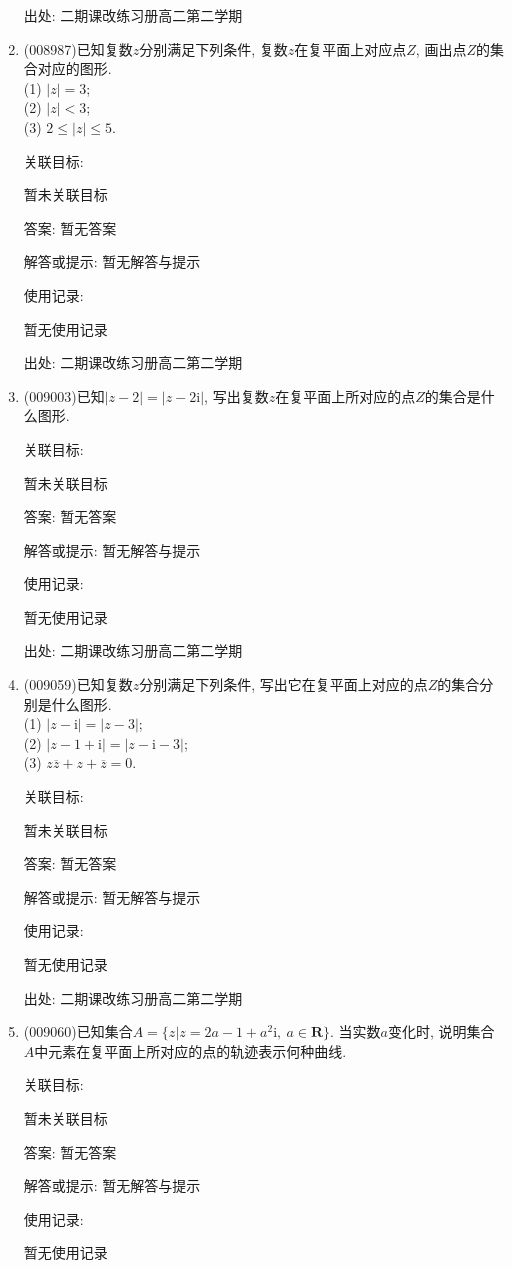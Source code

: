 \documentclass[10pt,a4paper]{article}
\begin{document}
\begin{enumerate}[1.]
出处: 二期课改练习册高二第二学期
\item { (008987)}已知复数$z$分别满足下列条件, 复数$z$在复平面上对应点$Z$, 画出点$Z$的集合对应的图形.\\
(1) $|z|=3$;\\ 
(2) $|z|<3$;\\
(3) $2\le|z|\le 5$.


关联目标:

暂未关联目标

答案: 暂无答案

解答或提示: 暂无解答与提示

使用记录:

暂无使用记录


出处: 二期课改练习册高二第二学期
\item { (009003)}已知$|z-2|=|z-2\mathrm{i}|$, 写出复数$z$在复平面上所对应的点$Z$的集合是什么图形.


关联目标:

暂未关联目标

答案: 暂无答案

解答或提示: 暂无解答与提示

使用记录:

暂无使用记录


出处: 二期课改练习册高二第二学期
\item { (009059)}已知复数$z$分别满足下列条件, 写出它在复平面上对应的点$Z$的集合分别是什么图形.\\
(1) $|z-\mathrm{i}|=|z-3|$;\\ 
(2) $|z-1+\mathrm{i}|=|z-\mathrm{i}-3|$;\\
(3) $z\overline z+z+\overline z=0$.


关联目标:

暂未关联目标

答案: 暂无答案

解答或提示: 暂无解答与提示

使用记录:

暂无使用记录


出处: 二期课改练习册高二第二学期
\item { (009060)}已知集合$A=\{z|z=2a-1+a^2\mathrm{i},\ a\in \mathbf{R}\}$. 当实数$a$变化时, 说明集合$A$中元素在复平面上所对应的点的轨迹表示何种曲线.


关联目标:

暂未关联目标

答案: 暂无答案

解答或提示: 暂无解答与提示

使用记录:

暂无使用记录



\end{enumerate}
\end{document}
